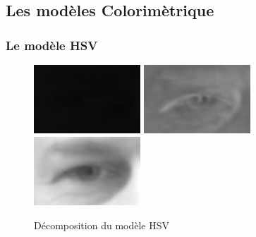 % 
% 
% 

\subsection{Les modèles Colorimètrique}
\subsubsection{Le modèle HSV}


\begin{figure}[H]
 \center
 \includegraphics[width=4cm]{image/hue.png}
 \includegraphics[width=4cm]{image/saturation.png}
 \includegraphics[width=4cm]{image/value.png}
 \caption{Décomposition du modèle HSV}
\end{figure}

